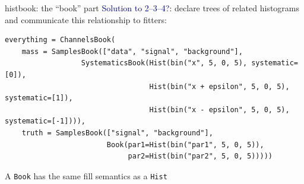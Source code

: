 \documentclass[aspectratio=169]{beamer}
\begin{document}
\begin{frame}[fragile]{histbook: the ``book'' part}
\vspace{0.5 cm}
\textcolor{darkblue}{Solution to 2--3--4?:} declare trees of related histograms and communicate this relationship to fitters:

\scriptsize
\begin{verbatim}
everything = ChannelsBook(
    mass = SamplesBook(["data", "signal", "background"],
                  SystematicsBook(Hist(bin("x", 5, 0, 5), systematic=[0]),
                                  Hist(bin("x + epsilon", 5, 0, 5), systematic=[1]),
                                  Hist(bin("x - epsilon", 5, 0, 5), systematic=[-1]))),
    truth = SamplesBook(["signal", "background"],
                        Book(par1=Hist(bin("par1", 5, 0, 5)),
                             par2=Hist(bin("par2", 5, 0, 5)))))
\end{verbatim}

\vspace{0.5 cm}
A {\tt\small Book} has the same fill semantics as a {\tt\small Hist}


\end{frame}
\end{document}
